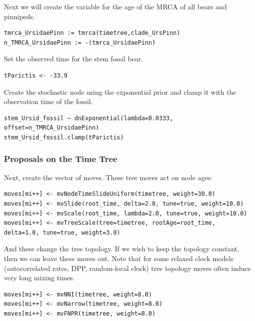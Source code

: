 Next we will create the variable for the age of the MRCA of all bears and pinnipeds.
{\tt \begin{snugshade*}
\begin{lstlisting}
tmrca_UrsidaePinn := tmrca(timetree,clade_UrsPinn)
n_TMRCA_UrsidaePinn := -(tmrca_UrsidaePinn)
\end{lstlisting}
\end{snugshade*}}

Set the observed time for the stem fossil bear.
{\tt \begin{snugshade*}
\begin{lstlisting}
tParictis <- -33.9
\end{lstlisting}
\end{snugshade*}}

Create the stochastic node using the exponential prior and clamp it with the observation time of the fossil.
{\tt \begin{snugshade*}
\begin{lstlisting}
stem_Ursid_fossil ~ dnExponential(lambda=0.0333, offset=n_TMRCA_UrsidaePinn)
stem_Ursid_fossil.clamp(tParictis)
\end{lstlisting}
\end{snugshade*}}

\subsubsection{Proposals on the Time Tree}

Next, create the vector of moves. These tree moves act on node ages:
{\tt \begin{snugshade*}
\begin{lstlisting}
moves[mi++] <- mvNodeTimeSlideUniform(timetree, weight=30.0)
moves[mi++] <- mvSlide(root_time, delta=2.0, tune=true, weight=10.0)
moves[mi++] <- mvScale(root_time, lambda=2.0, tune=true, weight=10.0)
moves[mi++] <- mvTreeScale(tree=timetree, rootAge=root_time, delta=1.0, tune=true, weight=3.0)
\end{lstlisting}
\end{snugshade*}}

And these change the tree topology. If we wish to keep the topology constant, then we can leave these moves out. Note that for some relaxed clock models (autocorrelated rates, DPP, random-local clock) tree topology moves often induce very long mixing times.
{\tt \begin{snugshade*}
\begin{lstlisting}
moves[mi++] <- mvNNI(timetree, weight=8.0)
moves[mi++] <- mvNarrow(timetree, weight=8.0)
moves[mi++] <- mvFNPR(timetree, weight=8.0)
\end{lstlisting}
\end{snugshade*}}



